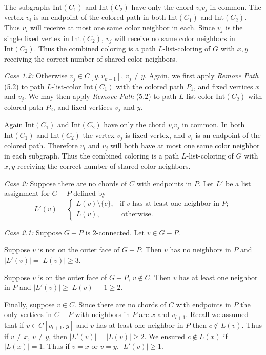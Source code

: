 \documentclass[letterpaper, 12pt]{article}
\theoremstyle{definition}
\theoremstyle{definition}
\theoremstyle{thm}
\theoremstyle{definition}
\begin{document}
The subgraphs $\text{Int}(C_1)$ and $\text{Int}(C_2)$ have only the chord
$v_iv_j$ in common. The vertex $v_i$ is an endpoint of the colored path in both
$\text{Int}(C_1)$ and $\text{Int}(C_2)$. Thus $v_i$ will receive at most one
same color neighbor in each. Since $v_j$ is the single fixed vertex in
$\text{Int}(C_2)$, $v_j$ will receive no same color neighbors in
$\text{Int}(C_2)$. Thus the combined coloring is a path $L$-list-coloring of
$G$ with $x,y$ receiving the correct number of shared color neighbors.

\textit{Case 1.2:} Otherwise $v_j\in C[y,v_{k-1}]$, $v_j\ne y$. Again, we first
apply \textit{Remove Path} (5.2) to path $L$-list-color $\text{Int}(C_1)$ with
the colored path $P_1$, and fixed vertices $x$ and $v_j$.
We may then apply \textit{Remove Path} (5.2) to path $L$-list-color
$\text{Int}(C_2)$ with colored path $P_2$, and fixed vertices $v_j$ and $y$.

Again $\text{Int}(C_1)$ and $\text{Int}(C_2)$ have only the chord $v_iv_j$ in
common. In both $\text{Int}(C_1)$ and $\text{Int}(C_2)$ the vertex $v_j$ is
fixed vertex, and $v_i$ is an endpoint of the colored path. Therefore $v_i$ and
$v_j$ will both have at most one same color neighbor in each subgraph. Thus the
combined coloring is a path $L$-list-coloring of $G$ with $x,y$ receiving the
correct number of shared color neighbors.

\textit{Case 2:} Suppose there are no chords of $C$ with endpoints in $P$.
Let $L'$ be a list assignment for $G-P$ defined by
\[
	L'(v) = \begin{cases}
				L(v)\setminus\{c\}, & \text{if } v \text{ has at least one
				    neighbor in } P;\\
				L(v), & \ \text{otherwise}.
			\end{cases}
\]

\textit{Case 2.1:} Suppose $G-P$ is $2$-connected. Let $v\in G-P$.

Suppose $v$ is not on the outer face of $G-P$. Then $v$ has no neighbors in $P$
and $|L'(v)|=|L(v)|\ge 3$.

Suppose $v$ is on the outer face of $G-P$, $v\not\in C$. Then $v$ has at
least one neighbor in $P$ and $|L'(v)|\ge |L(v)|-1\ge 2$.

Finally, suppose $v\in C$. Since there are no chords of $C$ with endpoints in
$P$ the only vertices in $C-P$ with neighbors in $P$ are $x$ and $v_{l+1}$.
Recall we assumed that if $v\in C[v_{l+1},y]$ and $v$ has at least one neighbor
in $P$ then $c\not\in L(v)$. Thus if $v\ne x$, $v\ne y$, then
$|L'(v)|=|L(v)|\ge 2$. We ensured $c\not\in L(x)$ if $|L(x)|=1$. Thus if $v=x$
or $v=y$, $|L'(v)|\ge 1$.
\end{document}
